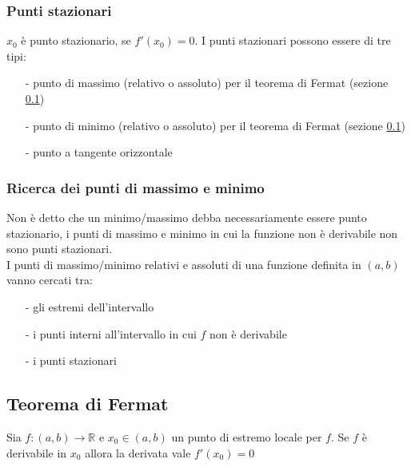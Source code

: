 \documentclass[a4paper]{article}
\begin{document}
\subsubsection*{Punti stazionari}
\(x_0\) è punto stazionario, se \(f'(x_0) = 0\). I punti stazionari possono essere di tre tipi:
\begin{itemize} [topsep=3pt, itemsep=0pt]
	\item[-] punto di massimo (relativo o assoluto) per il teorema di Fermat (sezione \ref{fermat})
	\item[-] punto di minimo (relativo o assoluto) per il teorema di Fermat (sezione \ref{fermat})
	\item[-] punto a tangente orizzontale
\end{itemize}

\subsubsection*{Ricerca dei punti di massimo e minimo}
Non è detto che un minimo/massimo debba necessariamente essere punto stazionario, i punti di massimo e minimo in cui la funzione non è derivabile
non sono punti stazionari. \\
I punti di massimo/minimo relativi e assoluti di una funzione definita in \(\left(a, b\right)\) vanno cercati tra:
\begin{itemize} [topsep=3pt, itemsep=0pt]
	\item[-] gli estremi dell'intervallo
	\item[-] i punti interni all'intervallo in cui \(f\) non è derivabile
	\item[-] i punti stazionari
\end{itemize}

\subsection{Teorema di Fermat} \label{fermat}
Sia \(f:\left(a, b\right) \to \mathbb{R}\) e \(x_0 \in \left(a, b\right)\) un punto di estremo locale per \(f\). Se \(f\) è derivabile in \(x_0\)
allora la derivata vale \(f'(x_0) = 0\)
\end{document}
